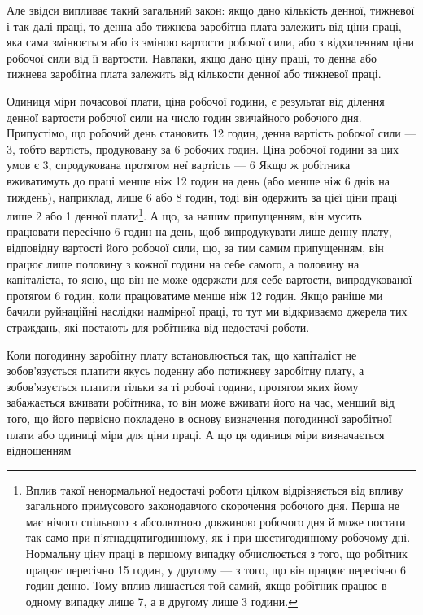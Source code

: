 Але звідси випливає такий загальний закон: якщо дано кількість
денної, тижневої і так далі праці, то денна або тижнева
заробітна плата залежить від ціни праці, яка сама змінюється
або із зміною вартости робочої сили, або з відхиленням ціни робочої
сили від її вартости. Навпаки, якщо дано ціну праці, то денна
або тижнева заробітна плата залежить від кількости денної або
тижневої праці.

Одиниця міри почасової плати, ціна робочої години, є результат
від ділення денної вартости робочої сили на число годин звичайного
робочого дня. Припустімо, що робочий день становить
12 годин, денна вартість робочої сили — 3, тобто вартість,
продуковану за 6 робочих годин. Ціна робочої години за
цих умов є 3, спродукована протягом неї вартість — 6
Якщо ж робітника вживатимуть до праці менше ніж 12 годин
на день (або менше ніж 6 днів на тиждень), наприклад, лише
6 або 8 годин, тоді він одержить за цієї ціни праці лише 2 або
1 денної плати\footnote{
Вплив такої ненормальної недостачі роботи цілком відрізняється
від впливу загального примусового законодавчого скорочення робочого
дня. Перша не має нічого спільного з абсолютною довжиною робочого
дня й може постати так само при п’ятнадцятигодинному, як і при шестигодинному
робочому дні. Нормальну ціну праці в першому випадку обчислюється
з того, що робітник працює пересічно 15 годин, у другому — з
того, що він працює пересічно 6 годин денно. Тому вплив лишається той
самий, якщо робітник працює в одному випадку лише 7, а в другому
лише 3 години.
}. А що, за нашим припущенням, він
мусить працювати пересічно 6 годин на день, щоб випродукувати
лише денну плату, відповідну вартості його робочої сили, що,
за тим самим припущенням, він працює лише половину з кожної
години на себе самого, а половину на капіталіста, то ясно, що
він не може одержати для себе вартости, випродукованої протягом
6 годин, коли працюватиме менше ніж 12 годин. Якщо раніше
ми бачили руйнаційні наслідки надмірної праці, то тут ми відкриваємо
джерела тих страждань, які постають для робітника від
недостачі роботи.

Коли погодинну заробітну плату встановлюється так, що
капіталіст не зобов’язується платити якусь поденну або потижневу
заробітну плату, а зобов’язується платити тільки за ті
робочі години, протягом яких йому забажається вживати робітника,
то він може вживати його на час, менший від того, що його
первісно покладено в основу визначення погодинної заробітної
плати або одиниці міри для ціни праці. А що ця одиниця міри
визначається відношенням

